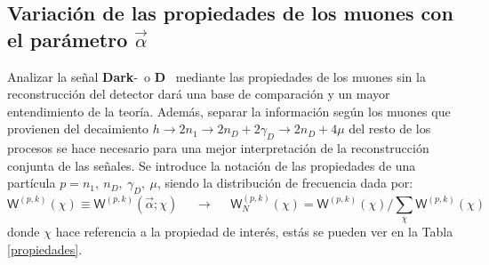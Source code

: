 \subsection{Variación de las propiedades de los muones con el parámetro $\vec{\alpha}$}

Analizar la señal \textbf{Dark}-\SUSY ~o \MSSM\textbf{D}~ mediante las propiedades de los muones sin la reconstrucción del detector dará una base de comparación y un mayor entendimiento de la teoría. Además, separar la información según los muones que provienen del decaimiento $h \rightarrow 2n_1 \rightarrow 2n_D + 2\gamma_D \rightarrow 2n_D + 4\mu$ del resto de los procesos se hace necesario para una mejor interpretación de la reconstrucción conjunta de las señales. Se introduce la notación de las propiedades de una partícula $p= n_1, ~n_D, ~\gamma_D, ~\mu$, siendo la distribución de frecuencia dada por:
\begin{equation}
\textsf{W}^{(p,k)} (\chi) \equiv \textsf{W}^{(p,k)} (\vec{\alpha}; \chi) ~~~~~~ \longrightarrow ~~~~~~ \textsf{W}^{(p,k)}_N (\chi) = \textsf{W}^{(p,k)} (\chi)/ \sum_\chi \textsf{W}^{(p,k)} (\chi)
\end{equation}
donde $\chi$ hace referencia a la propiedad de interés, estás se pueden ver en la Tabla \ref{propiedades}.

